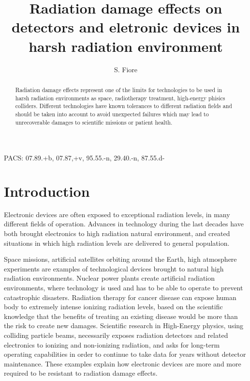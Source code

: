 \documentclass[twoside,a4paper]{article}
\begin{document}
\title{Radiation damage effects on detectors and eletronic devices in harsh radiation environment}

\author{S. Fiore}


\maketitle                   

{PACS: 07.89.+b, 07.87,+v, 95.55.-n, 29.40.-n, 87.55.d-}

\begin{abstract}
Radiation damage effects represent one of the limits for technologies to be used in harsh radiation environments as space, radiotherapy treatment, high-energy phisics colliders. Different technologies have known tolerances to different radiation fields and should be taken into account to avoid unexpected failures which may lead to unrecoverable damages to scientific missions or patient health.
\end{abstract}


\section{Introduction}
Electronic devices are often exposed to exceptional radiation levels, in many different fields of operation. Advances in technology during the last decades have both brought electronics to high radiation natural environment, and created situations in which high radiation levels are delivered to general population.

Space missions, artificial satellites orbiting around the Earth, high atmosphere experiments are examples of technological devices brought to natural high radiation environments. Nuclear power plants create artificial radiation environments, where technology is used and has to be able to operate to prevent catastrophic disasters. 
Radiation therapy for cancer disease can expose human body to extremely intense ionizing radiation levels, based on the scientific knowledge that the benefits of treating an existing disease would be more than the risk to create new damages. Scientific research in High-Energy physics, using colliding particle beams, necessarily exposes radiation detectors and related electronics to ionizing and non-ionizing radiation, and asks for long-term operating capabilities in order to continue to take data for years without detector maintenance.
These examples explain how electronic devices are more and more required to be resistant to radiation damage effects. 
\end{document}
